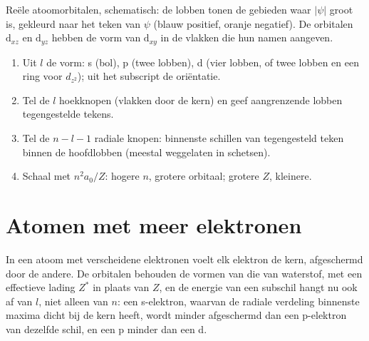 \begin{omfigure}

{\small Reële atoomorbitalen, schematisch: de lobben tonen de gebieden waar $|\psi|$
groot is, gekleurd naar het teken van $\psi$ (blauw positief, oranje negatief). De
orbitalen $\mathrm d_{xz}$ en $\mathrm d_{yz}$ hebben de vorm van $\mathrm d_{xy}$ in
de vlakken die hun namen aangeven.}
\end{omfigure}

\begin{method}\label{met:b2:atomic-orbitals:draw-orbital}
\begin{enumerate}
  \item Uit $l$ de vorm: s (bol), p (twee lobben), d (vier lobben, of twee
        lobben en een ring voor $d_{z^2}$); uit het subscript de oriëntatie.
  \item Tel de $l$ hoekknopen (vlakken door de kern) en geef
        aangrenzende lobben tegengestelde tekens.
  \item Tel de $n - l - 1$ radiale knopen: binnenste schillen van tegengesteld teken binnen
        de hoofdlobben (meestal weggelaten in schetsen).
  \item Schaal met $n^2a_0/Z$: hogere $n$, grotere orbitaal; grotere $Z$, kleinere.
\end{enumerate}
\end{method}

\section{Atomen met meer elektronen}

In een atoom met verscheidene elektronen voelt elk elektron de kern, afgeschermd door
de andere. De orbitalen behouden de vormen van die van waterstof, met een effectieve
lading $Z^*$ in plaats van $Z$, en de energie van een subschil hangt nu ook af van $l$,
niet alleen van $n$: een s-elektron, waarvan de radiale verdeling binnenste maxima dicht bij
de kern heeft, wordt minder afgeschermd dan een p-elektron van dezelfde schil, en een p minder
dan een d.

